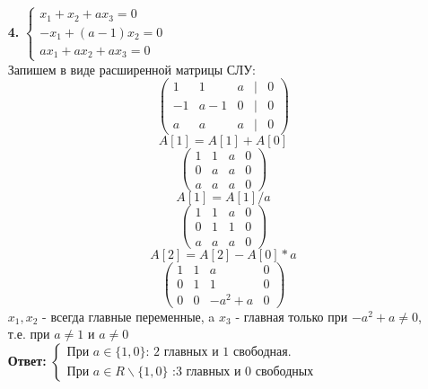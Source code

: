 \documentclass[a4paper]{article}
\begin{document}
\begin{enumerate}
    \item[\textbf{4.}]
    $\begin{cases}
        x_1 + x_2 + a x_3 = 0 \\ -x_1 + (a-1)x_2 = 0 \\ ax_1 + ax_2 + ax_3 = 0
    \end{cases}$\\
    Запишем в виде расширенной матрицы СЛУ:
    \[
    \begin{pmatrix}
    1 & 1 & a & | & 0 \\
    -1 & a-1 & 0 & | & 0 \\
    a & a & a & | & 0
    \end{pmatrix}
    \]
    \[A[1] = A[1]+A[0]\]
    \[
    \begin{pmatrix}
    1 & 1 & a & 0 \\
    0 & a & a & 0 \\
    a & a & a & 0
    \end{pmatrix}
    \]
    \[A[1] = A[1]/a\]
    \[
    \begin{pmatrix}
    1 & 1 & a & 0 \\
    0 & 1 & 1 & 0 \\
    a & a & a & 0
    \end{pmatrix}
    \]
    \[A[2] = A[2] - A[0]*a\]
    \[
    \begin{pmatrix}
    1 & 1 & a & 0 \\
    0 & 1 & 1 & 0 \\
    0 & 0 & -a^2 + a & 0
    \end{pmatrix}
    \]
    $x_1, x_2$ - всегда главные переменные, a $x_3$ - главная только при $-a^2+a \neq 0$, т.е. при $a\neq 1$ и $a \neq 0$\\
    \textbf{Ответ: } 
    $\begin{cases}
        \text{При $a\in \{1, 0\}$: 2 главных и 1 свободная.} \\ 
        \text{При $a\in R\smallsetminus\{1, 0\} $ :3 главных и 0 свободных} 
    \end{cases}$\\


\end{enumerate}
\end{document}
